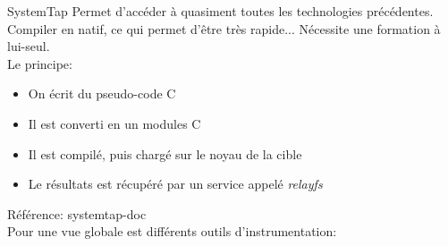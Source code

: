 \begin{frame}[fragile=singleslide]{SystemTap}
  Permet    d'accéder   à    quasiment   toutes    les   technologies
  précédentes.  Compiler  en  natif,   ce  qui  permet  d'être  très
  rapide... Nécessite une formation à lui-seul.
  \\[2ex]
  Le principe:
  \begin{itemize} 
  \item  On écrit du pseudo-code C
  \item  Il est converti en un modules C
  \item  Il est compilé, puis chargé sur le noyau de la cible
  \item  Le résultats est récupéré par un service appelé \emph{relayfs}
  \end{itemize} 
  Référence: systemtap-doc
  \\[2ex]
  Pour   une   vue  globale   est   différents   outils  d'instrumentation:
\end{frame} 






